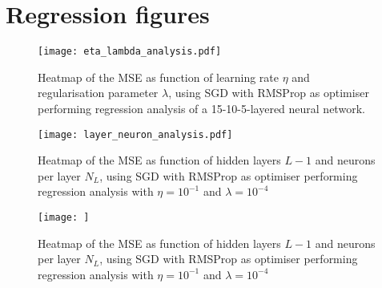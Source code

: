 
\newpage

\appendix

\section{Regression figures}

\begin{figure}[h!]
    \texttt{[image: eta\_lambda\_analysis.pdf]}
    \caption{Heatmap of the MSE as function of learning rate $\eta$ and regularisation parameter $\lambda$, using SGD with RMSProp as optimiser performing regression analysis of a 15-10-5-layered neural network. }
    \label{fig:reg_eta_lambda}
\end{figure}

\begin{figure}[h!]
    \texttt{[image: layer\_neuron\_analysis.pdf]}
    \caption{Heatmap of the MSE as function of hidden layers $L-1$ and neurons per layer $N_L$, using SGD with RMSProp as optimiser performing regression analysis with $\eta=10^{-1}$ and $\lambda=10^{-4}$ }
    \label{fig:reg_layer_neuron}
\end{figure}

\begin{figure}[h!]
    \texttt{[image: ]}
    \caption{Heatmap of the MSE as function of hidden layers $L-1$ and neurons per layer $N_L$, using SGD with RMSProp as optimiser performing regression analysis with $\eta=10^{-1}$ and $\lambda=10^{-4}$ }
    \label{fig:reg_layer_neuron}
\end{figure}

